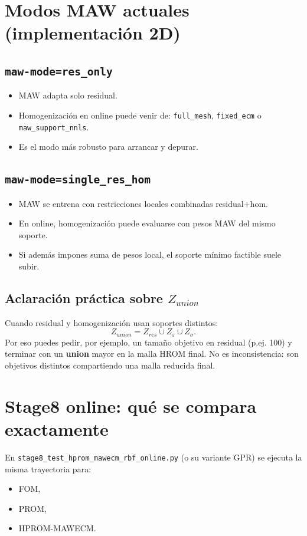 \documentclass[11pt,a4paper]{article}
\begin{document}
\section{Modos MAW actuales (implementación 2D)}
\subsection{\texttt{maw-mode=res\_only}}
\begin{itemize}[leftmargin=1.5em]
\item MAW adapta solo residual.
\item Homogenización en online puede venir de:
\texttt{full\_mesh}, \texttt{fixed\_ecm} o \texttt{maw\_support\_nnls}.
\item Es el modo más robusto para arrancar y depurar.
\end{itemize}

\subsection{\texttt{maw-mode=single\_res\_hom}}
\begin{itemize}[leftmargin=1.5em]
\item MAW se entrena con restricciones locales combinadas residual+hom.
\item En online, homogenización puede evaluarse con pesos MAW del mismo soporte.
\item Si además impones suma de pesos local, el soporte mínimo factible suele subir.
\end{itemize}

\subsection{Aclaración práctica sobre \texorpdfstring{$Z_{union}$}{Z_union}}
Cuando residual y homogenización usan soportes distintos:
\[
Z_{union}=Z_{res}\cup Z_\varepsilon\cup Z_\sigma.
\]
Por eso puedes pedir, por ejemplo, un tamaño objetivo en residual (p.ej. 100)
y terminar con un \textbf{union} mayor en la malla HROM final.
No es inconsistencia: son objetivos distintos compartiendo una malla reducida final.

\section{Stage8 online: qué se compara exactamente}
En \texttt{stage8\_test\_hprom\_mawecm\_rbf\_online.py} (o su variante GPR) se ejecuta la misma trayectoria para:
\begin{itemize}[leftmargin=1.5em]
\item FOM,
\item PROM,
\item HPROM-MAWECM.
\end{itemize}
\end{document}
